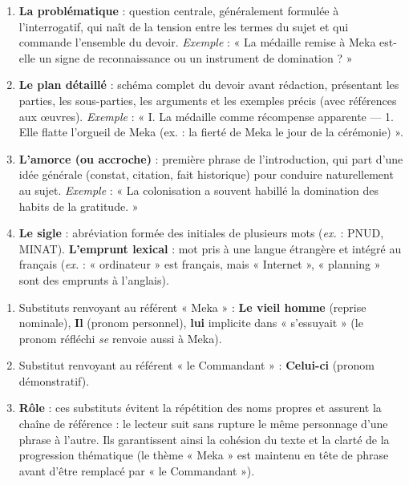 \documentclass[11pt]{article}
\newcommand{\cle}[1]{{\popxbold\color{popdark}#1}}
\begin{document}
\begin{corrige}
\begin{enumerate}
\item \textbf{La problématique} : question centrale, généralement formulée à l'interrogatif, qui naît de la tension entre les termes du sujet et qui commande l'ensemble du devoir. \emph{Exemple} : « La médaille remise à Meka est-elle un signe de reconnaissance ou un instrument de domination ? »
\item \textbf{Le plan détaillé} : schéma complet du devoir avant rédaction, présentant les parties, les sous-parties, les arguments et les exemples précis (avec références aux œuvres). \emph{Exemple} : « I. La médaille comme récompense apparente — 1. Elle flatte l'orgueil de Meka (ex. : la fierté de Meka le jour de la cérémonie) ».
\item \textbf{L'amorce (ou accroche)} : première phrase de l'introduction, qui part d'une idée générale (constat, citation, fait historique) pour conduire naturellement au sujet. \emph{Exemple} : « La colonisation a souvent habillé la domination des habits de la gratitude. »
\item \textbf{Le sigle} : abréviation formée des initiales de plusieurs mots (\emph{ex.} : PNUD, MINAT). \textbf{L'emprunt lexical} : mot pris à une langue étrangère et intégré au français (\emph{ex.} : « ordinateur » est français, mais « Internet », « planning » sont des emprunts à l'anglais).
\end{enumerate}
\end{corrige}

\begin{corrige}
\begin{enumerate}
\item Substituts renvoyant au référent « Meka » : \textbf{Le vieil homme} (reprise nominale), \textbf{Il} (pronom personnel), \textbf{lui} implicite dans « s'essuyait » (le pronom réfléchi \emph{se} renvoie aussi à Meka).
\item Substitut renvoyant au référent « le Commandant » : \textbf{Celui-ci} (pronom démonstratif).
\item \textbf{Rôle} : ces substituts évitent la répétition des noms propres et assurent la \cle{chaîne de référence} : le lecteur suit sans rupture le même personnage d'une phrase à l'autre. Ils garantissent ainsi la cohésion du texte et la clarté de la progression thématique (le thème « Meka » est maintenu en tête de phrase avant d'être remplacé par « le Commandant »).
\end{enumerate}
\end{corrige}
\end{document}
